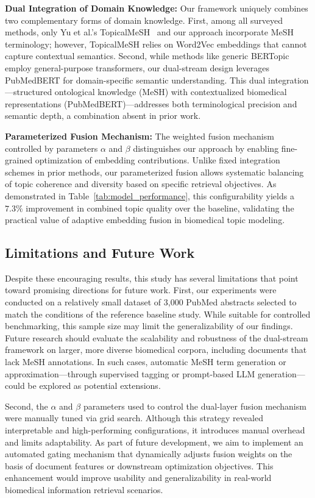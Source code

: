 \documentclass{ieeeaccess}
\begin{document}
\textbf{Dual Integration of Domain Knowledge:} Our framework uniquely combines two complementary forms of domain knowledge. First, among all surveyed methods, only Yu et al.'s TopicalMeSH~\cite{yu_improving_2016} and our approach incorporate MeSH terminology; however, TopicalMeSH relies on Word2Vec embeddings that cannot capture contextual semantics. Second, while methods like generic BERTopic~\cite{grootendorst_bertopic_2022} employ general-purpose transformers, our dual-stream design leverages PubMedBERT for domain-specific semantic understanding. This dual integration---structured ontological knowledge (MeSH) with contextualized biomedical representations (PubMedBERT)---addresses both terminological precision and semantic depth, a combination absent in prior work.

\textbf{Parameterized Fusion Mechanism:} The weighted fusion mechanism controlled by parameters $\alpha$ and $\beta$ distinguishes our approach by enabling fine-grained optimization of embedding contributions. Unlike fixed integration schemes in prior methods, our parameterized fusion allows systematic balancing of topic coherence and diversity based on specific retrieval objectives. As demonstrated in Table~\ref{tab:model_performance}, this configurability yields a $7.3\%$ improvement in combined topic quality over the baseline, validating the practical value of adaptive embedding fusion in biomedical topic modeling.

\subsection{Limitations and Future Work}

Despite these encouraging results, this study has several limitations that point toward promising directions for future work. First, our experiments were conducted on a relatively small dataset of 3,000 PubMed abstracts selected to match the conditions of the reference baseline study. While suitable for controlled benchmarking, this sample size may limit the generalizability of our findings. Future research should evaluate the scalability and robustness of the dual-stream framework on larger, more diverse biomedical corpora, including documents that lack MeSH annotations. In such cases, automatic MeSH term generation or approximation---through supervised tagging or prompt-based LLM generation---could be explored as potential extensions.

Second, the $\alpha$ and $\beta$ parameters used to control the dual-layer fusion mechanism were manually tuned via grid search. Although this strategy revealed interpretable and high-performing configurations, it introduces manual overhead and limits adaptability. As part of future development, we aim to implement an automated gating mechanism that dynamically adjusts fusion weights on the basis of document features or downstream optimization objectives. This enhancement would improve usability and generalizability in real-world biomedical information retrieval scenarios.
\end{document}
